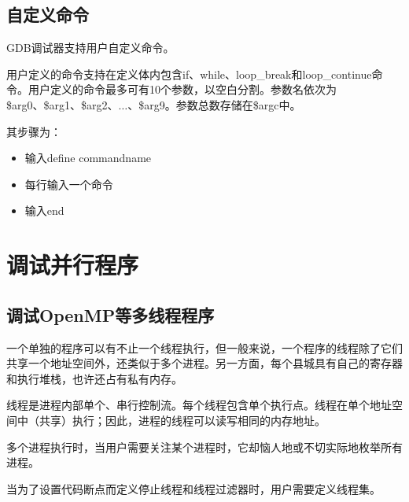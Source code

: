 \documentclass[a4paper,12pt,english]{sphinxmanual}
\begin{document}
\subsection{自定义命令}
\label{\detokenize{debug/debug:id23}}
\sphinxAtStartPar
GDB调试器支持用户自定义命令。

\sphinxAtStartPar
用户定义的命令支持在定义体内包含if、while、loop\_break和loop\_continue命令。用户定义的命令最多可有10个参数，以空白分割。参数名依次为\$arg0、\$arg1、\$arg2、\(\dots\)、\$arg9。参数总数存储在\$argc中。

\sphinxAtStartPar
其步骤为：
\begin{itemize}
\item {} 
\sphinxAtStartPar
输入define commandname

\item {} 
\sphinxAtStartPar
每行输入一个命令

\item {} 
\sphinxAtStartPar
输入end

\end{itemize}


\section{调试并行程序}
\label{\detokenize{debug/debug:id24}}

\subsection{调试OpenMP等多线程程序}
\label{\detokenize{debug/debug:openmp}}
\sphinxAtStartPar
一个单独的程序可以有不止一个线程执行，但一般来说，一个程序的线程除了它们共享一个地址空间外，还类似于多个进程。另一方面，每个县城具有自己的寄存器和执行堆栈，也许还占有私有内存。

\sphinxAtStartPar
线程是进程内部单个、串行控制流。每个线程包含单个执行点。线程在单个地址空间中（共享）执行；因此，进程的线程可以读写相同的内存地址。

\sphinxAtStartPar
多个进程执行时，当用户需要关注某个进程时，它却恼人地或不切实际地枚举所有进程。

\sphinxAtStartPar
当为了设置代码断点而定义停止线程和线程过滤器时，用户需要定义线程集。
\end{document}
